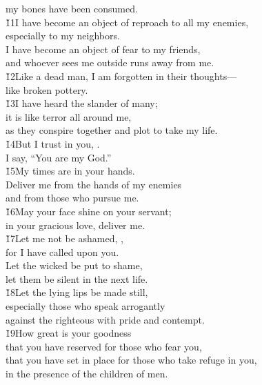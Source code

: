 \begin{poetry}
\poemll    my bones have been consumed. \\
\poeml \v{11}I have become an object of reproach to all my enemies, \\
\poemll    especially to my neighbors. \\
\poeml I have become an object of fear to my friends, \\
\poemll    and whoever sees me outside runs away from me. \\
\poeml \v{12}Like a dead man, I am forgotten in their thoughts--- \\
\poemll    like broken pottery. \\
\poeml \v{13}I have heard the slander of many; \\
\poemll    it is like terror all around me, \\
\poemlll       as they conspire together and plot to take my life. \\
\poeml \v{14}But I trust in you, . \\
\poemll    I say, ``You are my God.'' \\
\poeml \v{15}My times are in your hands. \\
\poemll    Deliver me from the hands of my enemies \\
\poemlll       and from those who pursue me. \\
\poeml \v{16}May your face shine on your servant; \\
\poemll    in your gracious love, deliver me. \\
\poeml \v{17}Let me not be ashamed, , \\
\poemll    for I have called upon you. \\
\poeml Let the wicked be put to shame, \\
\poemll    let them be silent in the next life. \\
\poeml \v{18}Let the lying lips be made still, \\
\poemll    especially those who speak arrogantly \\
\poemlll       against the righteous with pride and contempt. \\
\poeml \v{19}How great is your goodness \\
\poemll    that you have reserved for those who fear you, \\
\poeml that you have set in place for those who take refuge in you, \\
\poemll    in the presence of the children of men. \\

\end{poetry}
